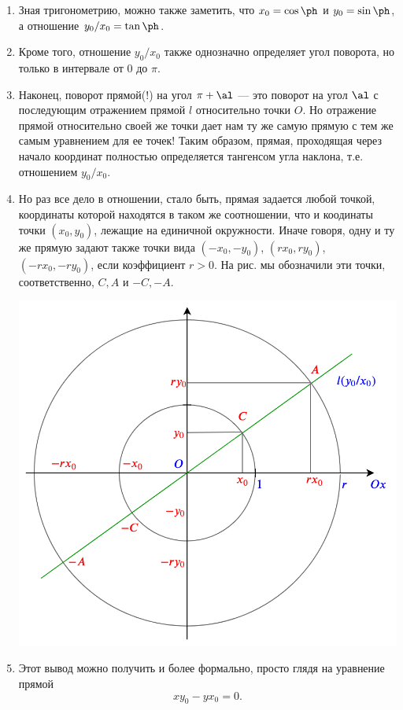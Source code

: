 \begin{enumerate}
\item Зная тригонометрию, можно также заметить, что $x_0=\cos\ph$ и $y_0=\sin\ph$, а отношение $y_0/x_0=\tan\ph$.
\item Кроме того, отношение $y_0/x_0$ также однозначно определяет угол поворота, но только в интервале от 0 до $\pi$.
\item Наконец, поворот прямой(!) на угол $\pi+\al$ --- это поворот на угол $\al$ с последующим отражением прямой $l$ относительно точки $O$. Но отражение прямой относительно своей же точки дает нам ту же самую прямую с тем же самым уравнением для ее точек! Таким образом, прямая, проходящая через начало координат полностью определяется тангенсом угла наклона, т.е. отношением $y_0/x_0$.
\item Но раз все дело в отношении, стало быть, прямая задается любой точкой, координаты которой находятся в таком же соотношении, что и коодинаты точки $(x_0,y_0)$, лежащие на единичной окружности. Иначе говоря, одну и ту же прямую задают также точки вида $(-x_0,-y_0)$, $(rx_0,ry_0)$, $(-rx_0,-ry_0)$, если коэффициент $r>0$. На рис. мы обозначили эти точки, соответственно, $C,A$ и $-C,-A$.
\begin{center}
\includegraphics[scale=0.3]{line.png}
\end{center}
\item Этот вывод можно получить и более формально, просто глядя на уравнение прямой
$$
xy_0-yx_0=0.
$$
\end{enumerate}
